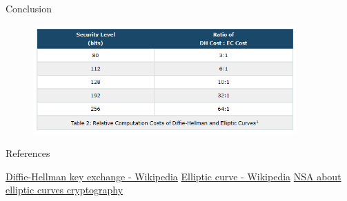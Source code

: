 \documentclass[aspectratio=169,xcolor=dvipsnames]{beamer}
\begin{document}

\begin{frame}{Conclusion}
\begin{figure}
    \centering
    \includegraphics[width=0.9\textwidth]{summary-02.PNG}
\end{figure}
    
\end{frame}

\begin{frame}{References}
    \footnotesize{
        \begin{thebibliography}{99}
             \href{https://en.wikipedia.org/wiki/Diffie\%E2\%80\%93Hellman_key_exchange}{Diffie-Hellman key exchange - Wikipedia}
             \href{https://en.wikipedia.org/wiki/Elliptic_curve}{Elliptic curve - Wikipedia}
             \href{https://web.archive.org/web/20130918005527/http://www.nsa.gov/business/programs/elliptic_curve.shtml}{NSA about elliptic curves cryptography}
        \end{thebibliography}
    }
\end{frame}
\end{document}
